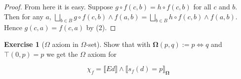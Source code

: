 \documentclass{article}
\newcommand{\Om}{\Omega}
\newcommand{\bO}{\mathbf{\Omega}}
\newcommand{\lb}{\llbracket}
\newcommand{\rb}{\rrbracket}
\theoremstyle{definition}
\newtheorem{ex}{Exercise}
\begin{document}
\begin{proof}
    From here it is easy. Suppose $g\circ f(c, b) = h\circ f(c, b)$ for all
    $c$ and $b$. Then for any $a$, $\bigsqcup_{b \in B} g\circ f(c, b) \wedge f(a, b) = \bigsqcup_{b \in B} h\circ f(c, b) \wedge f(a, b)$.
    Hence $g(c, a) = f(c, a)$ by (2).
\end{proof}
\newpage
\begin{ex}[$\Omega$ axiom in $\Omega$-set]

    Show that with $\bO(p,q) := p \Leftrightarrow q$
    and $\top(0, p) = p$ we get the $\Om$ axiom for 

    \begin{equation}\label{chi}
        \chi_f = \lb Ed \rb \wedge \lb s_f(d) = p \rb_\bO
    \end{equation} 

\end{ex}
\end{document}
